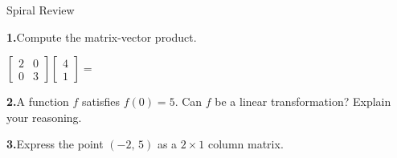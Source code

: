 \documentclass[10pt]{article}
\begin{document}
\namedateperiod

\vspace{0.12in}

\begin{notesbox}{Spiral Review}
\small

\textbf{1.}\quad Compute the matrix-vector product.

\vspace{0.08in}
\hspace{1em}
$\begin{bmatrix}2 & 0 \\ 0 & 3\end{bmatrix}
 \begin{bmatrix}4 \\ 1\end{bmatrix} = $ \blank{3.5cm}

\vspace{0.22in}

\textbf{2.}\quad A function $f$ satisfies $f(0) = 5$.
Can $f$ be a linear transformation?  Explain your reasoning.


\vspace{0.10in}

\textbf{3.}\quad Express the point $(-2,\, 5)$ as a $2 \times 1$ column matrix.

\vspace{0.08in}
\hspace{1em} \blank{2.5cm}

\end{notesbox}
\end{document}

